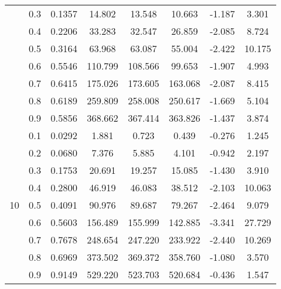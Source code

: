 \documentclass[11pt,a4paper]{report}
\begin{document}
\begin{longtable}{ | c | c || c | c | c | c | c | c | }
 & 0.3 & 0.1357 & 14.802 & 13.548 & 10.663 & -1.187 & 3.301 \\
 & 0.4 & 0.2206 & 33.283 & 32.547 & 26.859 & -2.085 & 8.724 \\
 & 0.5 & 0.3164 & 63.968 & 63.087 & 55.004 & -2.422 & 10.175 \\
 & 0.6 & 0.5546 & 110.799 & 108.566 & 99.653 & -1.907 & 4.993 \\
 & 0.7 & 0.6415 & 175.026 & 173.605 & 163.068 & -2.087 & 8.415 \\
 & 0.8 & 0.6189 & 259.809 & 258.008 & 250.617 & -1.669 & 5.104 \\
 & 0.9 & 0.5856 & 368.662 & 367.414 & 363.826 & -1.437 & 3.874 \\
 \hline
\multirow{9}{*}{10} & 0.1 & 0.0292 & 1.881 & 0.723 & 0.439 & -0.276 & 1.245 \\
 & 0.2 & 0.0680 & 7.376 & 5.885 & 4.101 & -0.942 & 2.197 \\
 & 0.3 & 0.1753 & 20.691 & 19.257 & 15.085 & -1.430 & 3.910 \\
 & 0.4 & 0.2800 & 46.919 & 46.083 & 38.512 & -2.103 & 10.063 \\
 & 0.5 & 0.4091 & 90.976 & 89.687 & 79.267 & -2.464 & 9.079 \\
 & 0.6 & 0.5603 & 156.489 & 155.999 & 142.885 & -3.341 & 27.729 \\
 & 0.7 & 0.7678 & 248.654 & 247.220 & 233.922 & -2.440 & 10.269 \\
 & 0.8 & 0.6969 & 373.502 & 369.372 & 358.760 & -1.080 & 3.570 \\
 & 0.9 & 0.9149 & 529.220 & 523.703 & 520.684 & -0.436 & 1.547 \\
 \hline
\hline
\end{longtable}
\end{document}
